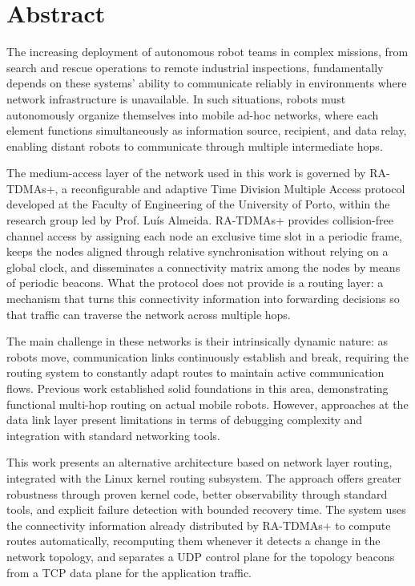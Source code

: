 
\vspace{1cm}

\chapter*{Abstract}

The increasing deployment of autonomous robot teams in complex missions, from
search and rescue operations to remote industrial inspections, fundamentally
depends on these systems' ability to communicate reliably in environments where
network infrastructure is unavailable. In such situations, robots must
autonomously organize themselves into mobile ad-hoc networks, where each element
functions simultaneously as information source, recipient, and data relay,
enabling distant robots to communicate through multiple intermediate hops.

The medium-access layer of the network used in this work is governed by
RA-TDMAs+, a reconfigurable and adaptive Time Division Multiple Access protocol
developed at the Faculty of Engineering of the University of Porto, within the
research group led by Prof. Lu\'{i}s Almeida. RA-TDMAs+ provides collision-free
channel access by assigning each node an exclusive time slot in a periodic
frame, keeps the nodes aligned through relative synchronisation without relying
on a global clock, and disseminates a connectivity matrix among the nodes by
means of periodic beacons. What the protocol does not provide is a routing
layer: a mechanism that turns this connectivity information into forwarding
decisions so that traffic can traverse the network across multiple hops.

The main challenge in these networks is their intrinsically dynamic nature: as
robots move, communication links continuously establish and break, requiring the
routing system to constantly adapt routes to maintain active communication flows.
Previous work established solid foundations in this area, demonstrating functional
multi-hop routing on actual mobile robots. However, approaches at the data link
layer present limitations in terms of debugging complexity and integration with
standard networking tools.

This work presents an alternative architecture based on network layer routing,
integrated with the Linux kernel routing subsystem. The approach offers greater
robustness through proven kernel code, better observability through standard
tools, and explicit failure detection with bounded recovery time. The system uses
the connectivity information already distributed by RA-TDMAs+ to compute routes
automatically, recomputing them whenever it detects a change in the network
topology, and separates a UDP control plane for the topology beacons from a TCP
data plane for the application traffic.

